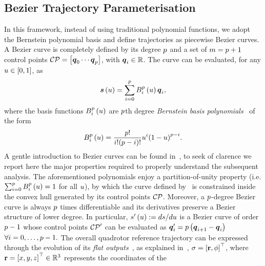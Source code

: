 \subsection{B\acuteacc ezier Trajectory Parameterisation}%
\label{SEC:EXPLORATION-TRAJECTORY-PARAMETERISATION}
In this framework, instead of using traditional polynomial functions, we adopt the Bernstein polynomial basis and define trajectories as
piecewise B\acuteacc ezier curves. A B\acuteacc ezier curve is completely defined by its degree $p$ and a set of $m = p+1$
control points $\mathcal{CP} = \left[ \boldsymbol{q}_0 \cdots \boldsymbol{q}_{p} \right]$, with $\boldsymbol{q}_i \in \mathbb{R}$. The curve can be evaluated, for any
$ u \in [0, 1]$, as
\begin{equation}
	\label{EQ:BEZIER-SIMPLE}
	\boldsymbol{s} \left( u \right) = \sum_{i=0}^{p} B_i^{p}\left( u \right) \boldsymbol{q}_i,
\end{equation}
where the basis functions $B_i^{p} \left( u \right)$ are $p$th degree
\emph{Bernstein basis polynomials}~\cite{farouki2012bernstein, biagiotti2008trajectory} of the form
\begin{equation*}
	B_i^{p}\left( u \right) = \frac{p!}{i!(p - i)!} u^i {(1 - u)}^{p - i}.
\end{equation*}
A gentle introduction to B\acuteacc ezier curves can be found in~, to seek of clarence we report here the major
properties required to properly understand the subsequent analysis. The aforementioned polynomials enjoy a partition-of-unity property
(i.e. $\sum_{i=0}^{p} B_i^{p} \left( u \right) = 1$ for all $u$), by which the curve defined by~
is constrained inside the convex hull generated by its control points $\mathcal{CP}$. Moreover, a $p$-degree B\acuteacc ezier curve is always
$p$ times differentiable and its derivatives preserve a B\acuteacc ezier structure of lower degree. In particular,
$s' \left( u \right) := ds/du$ is a B\acuteacc ezier curve of order $p-1$ whose control points $\mathcal{CP}'$ can be
evaluated as $\boldsymbol{q}'_i = p \left( \boldsymbol{q}_{i+1} - \boldsymbol{q}_i \right)$ $\forall i = 0, \dots, p-1.$ The overall quadrotor reference
trajectory can be expressed through the evolution of its \emph{flat outputs}~\cite{mellinger2011minimum}, as explained in~,
$\sigma = {\left[ \mathbf{r}, \phi \right]}^{\top}$, where $\mathbf{r} = {\left[ x, y, z \right]}^{\top} \in \mathbb{R}^3$ represents the coordinates of the

